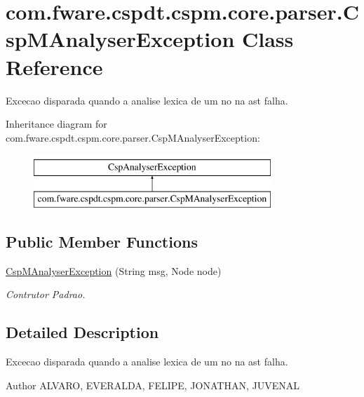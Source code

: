 \hypertarget{classcom_1_1fware_1_1cspdt_1_1cspm_1_1core_1_1parser_1_1_csp_m_analyser_exception}{}\section{com.\+fware.\+cspdt.\+cspm.\+core.\+parser.\+Csp\+M\+Analyser\+Exception Class Reference}
\label{classcom_1_1fware_1_1cspdt_1_1cspm_1_1core_1_1parser_1_1_csp_m_analyser_exception}


Excecao disparada quando a analise lexica de um no na ast falha.  


Inheritance diagram for com.\+fware.\+cspdt.\+cspm.\+core.\+parser.\+Csp\+M\+Analyser\+Exception\+:\begin{figure}[H]
\begin{center}
\leavevmode
\includegraphics[height=2.000000cm]{classcom_1_1fware_1_1cspdt_1_1cspm_1_1core_1_1parser_1_1_csp_m_analyser_exception}
\end{center}
\end{figure}
\subsection*{Public Member Functions}
\begin{DoxyCompactItemize}
\item 
\hyperlink{classcom_1_1fware_1_1cspdt_1_1cspm_1_1core_1_1parser_1_1_csp_m_analyser_exception_a4223ce06d5b1dedd5b60bf823488c7cf}{Csp\+M\+Analyser\+Exception} (String msg, Node node)
\begin{DoxyCompactList}\small\item\em Contrutor Padrao. \end{DoxyCompactList}\end{DoxyCompactItemize}


\subsection{Detailed Description}
Excecao disparada quando a analise lexica de um no na ast falha. 

\begin{DoxyAuthor}{Author}
A\+L\+V\+A\+RO, E\+V\+E\+R\+A\+L\+DA, F\+E\+L\+I\+PE, J\+O\+N\+A\+T\+H\+AN, J\+U\+V\+E\+N\+AL 
\end{DoxyAuthor}


